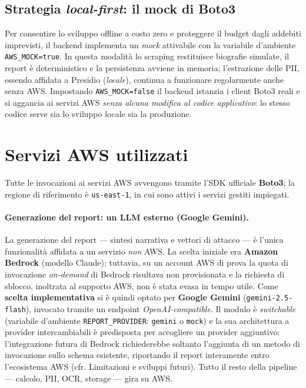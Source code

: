 \documentclass[11pt,a4paper]{article}
\begin{document}
\subsection{Strategia \emph{local-first}: il mock di Boto3}
Per consentire lo sviluppo offline a costo zero e proteggere il budget dagli addebiti
imprevisti, il backend implementa un \emph{mock} attivabile con la variabile
d'ambiente \texttt{AWS\_MOCK=true}. In questa modalità lo scraping restituisce
biografie simulate, il report è deterministico e la persistenza avviene in memoria;
l'estrazione delle PII, essendo affidata a Presidio (\emph{locale}), continua a funzionare
regolarmente anche senza AWS. Impostando
\texttt{AWS\_MOCK=false} il backend istanzia i client Boto3 reali e si aggancia ai
servizi AWS \emph{senza alcuna modifica al codice applicativo}: lo stesso codice
serve sia lo sviluppo locale sia la produzione.

\section{Servizi AWS utilizzati}

Tutte le invocazioni ai servizi AWS avvengono tramite l'SDK ufficiale \textbf{Boto3}; la
regione di riferimento è \texttt{us-east-1}, in cui sono attivi i servizi gestiti
impiegati.

\paragraph{Generazione del report: un LLM esterno (Google Gemini).} La generazione del
report --- sintesi narrativa e vettori di attacco --- è l'unica funzionalità affidata a
un servizio \emph{non} AWS. La scelta iniziale era \textbf{Amazon Bedrock} (modello
Claude); tuttavia, su un account AWS di prova la quota di invocazione \emph{on-demand} di
Bedrock risultava non provisionata e la richiesta di sblocco, inoltrata al supporto AWS,
non è stata evasa in tempo utile. Come \textbf{scelta implementativa} si è quindi optato per
\textbf{Google Gemini} (\texttt{gemini-2.5-flash}), invocato tramite un endpoint
\emph{OpenAI-compatible}. Il modulo è \emph{switchable}
(variabile d'ambiente \texttt{REPORT\_PROVIDER}: \texttt{gemini} o \texttt{mock}) e la sua
architettura a provider intercambiabili è predisposta per accogliere un provider
aggiuntivo: l'integrazione futura di Bedrock richiederebbe soltanto l'aggiunta di un
metodo di invocazione sullo schema esistente, riportando il report interamente entro
l'ecosistema AWS (cfr. Limitazioni e sviluppi futuri). Tutto il resto della pipeline --- calcolo, PII, OCR,
storage --- gira su AWS.
\end{document}
